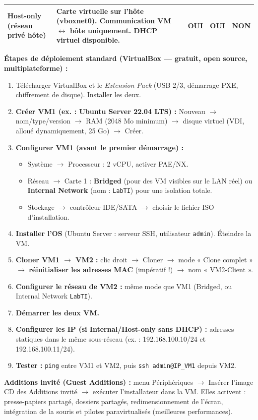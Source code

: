 \documentclass[11pt]{article}
\begin{document}
\begin{methode}
\begin{center}
\begin{tabularx}{\linewidth}{|l|X|c|c|c|}
\textbf{Host-only (réseau privé hôte)} & Carte virtuelle sur l'hôte (vboxnet0). Communication VM $\leftrightarrow$ hôte uniquement. DHCP virtuel disponible. & \textbf{OUI} & \textbf{OUI} & \textbf{NON} \\\hline
\end{tabularx}
\end{center}
\textbf{Étapes de déploiement standard (VirtualBox — gratuit, open source, multiplateforme) :}
\begin{enumerate}
    \item Télécharger VirtualBox et le \emph{Extension Pack} (USB 2/3, démarrage PXE, chiffrement de disque). Installer les deux.
    \item \textbf{Créer VM1 (ex. : Ubuntu Server 22.04 LTS) :} Nouveau $\rightarrow$ nom/type/version $\rightarrow$ RAM (2048 Mo minimum) $\rightarrow$ disque virtuel (VDI, alloué dynamiquement, 25 Go) $\rightarrow$ Créer.
    \item \textbf{Configurer VM1 (avant le premier démarrage) :}
        \begin{itemize}
            \item Système $\rightarrow$ Processeur : 2 vCPU, activer PAE/NX.
            \item Réseau $\rightarrow$ Carte 1 : \textbf{Bridged} (pour des VM visibles sur le LAN réel) ou \textbf{Internal Network} (nom : \texttt{LabTI}) pour une isolation totale.
            \item Stockage $\rightarrow$ contrôleur IDE/SATA $\rightarrow$ choisir le fichier ISO d'installation.
        \end{itemize}
    \item \textbf{Installer l'OS} (Ubuntu Server : serveur SSH, utilisateur \texttt{admin}). Éteindre la VM.
    \item \textbf{Cloner VM1 $\rightarrow$ VM2 :} clic droit $\rightarrow$ Cloner $\rightarrow$ mode « Clone complet » $\rightarrow$ \textbf{réinitialiser les adresses MAC} (impératif !) $\rightarrow$ nom « VM2-Client ».
    \item \textbf{Configurer le réseau de VM2 :} même mode que VM1 (Bridged, ou Internal Network \texttt{LabTI}).
    \item \textbf{Démarrer les deux VM.}
    \item \textbf{Configurer les IP (si Internal/Host-only sans DHCP) :} adresses statiques dans le même sous-réseau (ex. : 192.168.100.10/24 et 192.168.100.11/24).
    \item \textbf{Tester :} \texttt{ping} entre VM1 et VM2, puis \texttt{ssh admin@IP\_VM1} depuis VM2.
\end{enumerate}
\textbf{Additions invité (Guest Additions) :} menu Périphériques $\rightarrow$ Insérer l'image CD des Additions invité $\rightarrow$ exécuter l'installateur dans la VM. Elles activent : presse-papiers partagé, dossiers partagés, redimensionnement de l'écran, intégration de la souris et pilotes paravirtualisés (meilleures performances).
\end{methode}
\end{document}
